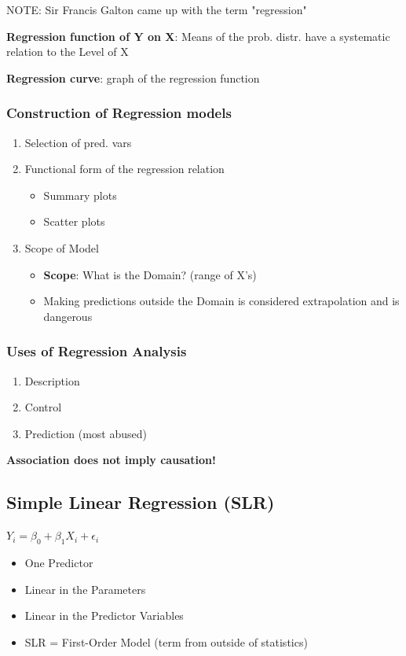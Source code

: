 \documentclass[11pt]{article}
\begin{document}
NOTE: Sir Francis Galton came up with the term "regression"

\textbf{Regression function of Y on X}: Means of the prob. distr. have a systematic relation to the Level of X

\textbf{Regression curve}: graph of the regression function

\subsubsection{Construction of Regression models}
\label{sec:org5dbfe68}
\begin{enumerate}
\item Selection of pred. vars
\item Functional form of the regression relation
\begin{itemize}
\item Summary plots
\item Scatter plots
\end{itemize}
\item Scope of Model
\begin{itemize}
\item \textbf{Scope}: What is the Domain? (range of X's)
\item Making predictions outside the Domain is considered extrapolation and is dangerous
\end{itemize}
\end{enumerate}
\subsubsection{Uses of Regression Analysis}
\label{sec:orgb8882fd}
\begin{enumerate}
\item Description
\item Control
\item Prediction (most abused)
\end{enumerate}

\textbf{Association does not imply causation!}
\subsection{Simple Linear Regression (SLR)}
\label{sec:org273f36e}

\(Y_i = \beta_0 + \beta_1 X_i + \epsilon_i\)
\begin{itemize}
\item One Predictor
\item Linear in the Parameters
\item Linear in the Predictor Variables
\item SLR = First-Order Model (term from outside of statistics)
\end{itemize}
\end{document}
